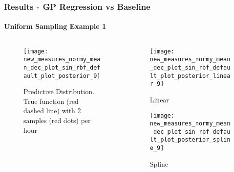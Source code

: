 \documentclass[
	8pt, %
]{beamer}
\begin{document}
\begin{frame}
	\frametitle{Results - GP Regression vs Baseline}
	\framesubtitle{Uniform Sampling Example 1}

	\begin{columns}[c] %
		\begin{column}{0.5\textwidth} %
				\begin{figure}
					\texttt{[image: new\_measures\_normy\_mean\_dec\_plot\_sin\_rbf\_default\_plot\_posterior\_9]}
					\caption{Predictive Distribution. True function (red dashed line) with 2 samples (red dots) per hour}
				\end{figure}
		\end{column}
		\begin{column}{0.5\textwidth} %
				\begin{figure}
					\texttt{[image: new\_measures\_normy\_mean\_dec\_plot\_sin\_rbf\_default\_plot\_posterior\_linear\_9]}
					\caption{Linear}
				\end{figure}

				\begin{figure}
					\texttt{[image: new\_measures\_normy\_mean\_dec\_plot\_sin\_rbf\_default\_plot\_posterior\_spline\_9]}
					\caption{Spline}
				\end{figure}
		\end{column}
	\end{columns}

\end{frame}
\end{document}
